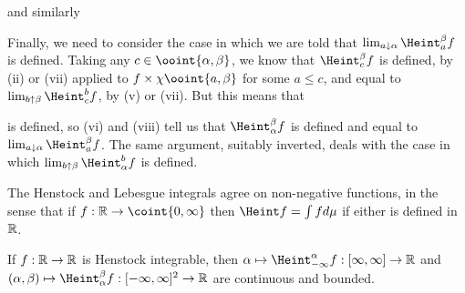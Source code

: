 {\noindent and similarly


\medskip

 Finally, we need to consider the case in which we are told
that $\lim_{a\downarrow\alpha}\Heint_a^{\beta}f$ is defined.
Taking any $c\in\ooint{\alpha,\beta}$, we know that $\Heint_c^{\beta}f$
is defined, by (ii) or (vii) applied to $f\times\chi\ooint{a,\beta}$ for
some $a\le c$, and equal to
$\lim_{b\uparrow\beta}\Heint_c^bf$, by (v) or (vii).   But this means that


\noindent is defined, so (vi) and (viii) tell us that
$\Heint_{\alpha}^{\beta}f$ is defined and equal to
$\lim_{a\downarrow\alpha}\Heint_a^{\beta}f$.   The same argument, suitably
inverted, deals with the case in which
$\lim_{b\uparrow \beta}\Heint_{\alpha}^bf$ is defined.
}%

 The Henstock and Lebesgue integrals agree on
non-negative functions, in the sense that if
$f:\Bbb R\to\coint{0,\infty}$ then $\Heint f=\int fd\mu$ if either is
defined in $\Bbb R$.


 If $f:\Bbb R\to\Bbb R$ is Henstock integrable,
then
$\alpha\mapsto\Heint_{-\infty}^{\alpha}f:[\infty,\infty]\to\Bbb R$ and
$(\alpha,\beta)\mapsto\Heint_{\alpha}^{\beta}f:
[-\infty,\infty]^2\to\Bbb R$ are continuous and bounded.

